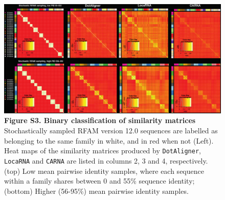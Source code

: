 \documentclass{bmcart}
\newcommand\dotaligner{\texttt{DotAligner}}
\newcommand\locarna{\texttt{LocaRNA}}
\newcommand\carna{\texttt{CARNA}}
\begin{document}
\begin{figure}
    \includegraphics[width=\textwidth]{SF3}
     \caption*{ \textbf{ Figure S3. Binary classification of similarity matrices  }\\
Stochastically sampled RFAM version 12.0 sequences are labelled as belonging to the same family in white, and in red when not (Left). Heat maps of the similarity matrices produced by \dotaligner{}, \locarna{} and \carna{} are listed in columns 2, 3 and 4, respectively.  
(top) Low mean pairwise identity samples, where each sequence within 
a family shares between 0 and 55\% sequence identity; (bottom) Higher (56-95\%) mean pairwise identity samples. }
\end{figure}
\end{document}
